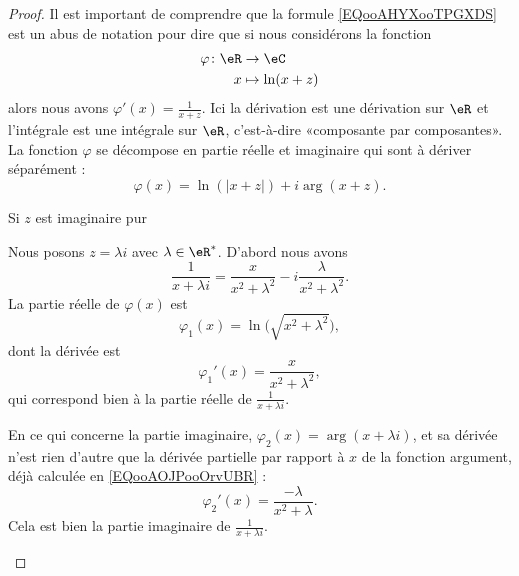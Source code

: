 \begin{proof}
    Il est important de comprendre que la formule \eqref{EQooAHYXooTPGXDS} est un abus de notation pour dire que si nous considérons la fonction
    \begin{equation}
        \begin{aligned}
            \varphi\colon \eR&\to \eC \\
            x&\mapsto \ln(x+z)
        \end{aligned}
    \end{equation}
    alors nous avons \( \varphi'(x)=\frac{1}{ x+z }\). Ici la dérivation est une dérivation sur \( \eR\) et l'intégrale est une intégrale sur \( \eR\), c'est-à-dire «composante par composantes». La fonction \(  \varphi\) se décompose en partie réelle et imaginaire qui sont à dériver séparément :
    \begin{equation}
        \varphi(x)=\ln(| x+z |)+i\arg(x+z).
    \end{equation}

    \begin{subproof}

        \item[Si \( z\) est imaginaire pur]

            Nous posons \( z=\lambda i\) avec \( \lambda\in \eR^*\). D'abord nous avons
            \begin{equation}
                \frac{1}{ x+\lambda i }=\frac{ x }{ x^2+\lambda^2 }-i\frac{ \lambda }{ x^2+\lambda^2 }.
            \end{equation}
            La partie réelle de \( \varphi(x)\) est
            \begin{equation}
                \varphi_1(x)=\ln\big( \sqrt{ x^2+\lambda^2 } \big),
            \end{equation}
            dont la dérivée est
            \begin{equation}
                \varphi_1'(x)=\frac{ x }{ x^2+\lambda^2 },
            \end{equation}
            qui correspond bien à la partie réelle de \( \frac{1}{ x+\lambda i }\).

            En ce qui concerne la partie imaginaire, \( \varphi_2(x)=\arg(x+\lambda i)\), et sa dérivée n'est rien d'autre que la dérivée partielle par rapport à \( x\) de la fonction argument, déjà calculée en \eqref{EQooAOJPooOrvUBR} :
            \begin{equation}
                \varphi_2'(x)=\frac{ -\lambda }{ x^2+\lambda }.
            \end{equation}
            Cela est bien la partie imaginaire de \( \frac{1}{ x+\lambda i }\).


\end{subproof}
\end{proof}
